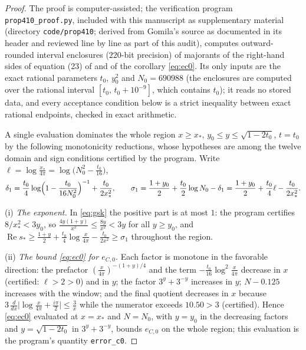 \documentclass[11pt]{article}
\theoremstyle{definition}
\DeclareMathOperator{\Rea}{Re}
\begin{document}
\begin{proof}
The proof is computer-assisted; the verification program
\texttt{prop410\_proof.py}, included with this manuscript as
supplementary material (directory \texttt{code/prop410}; derived
from Gomila's source as documented in its header and reviewed line
by line as part of this audit), computes outward-rounded interval
enclosures ($220$-bit precision) of majorants of the right-hand
sides of equation (23) of \cite{Polymath} and of the corollary
\eqref{eq:ec0}. Its only inputs are the exact rational parameters
$t_0$, $y_0^2$ and $N_0=690988$ (the enclosures are computed over
the rational interval $[t_0,\,t_0+10^{-9}]$, which contains $t_0$);
it reads no stored data, and every acceptance condition below is a
strict inequality between exact rational endpoints, checked in
exact arithmetic.

A single evaluation dominates the whole region $x\ge x_*$,
$y_0\le y\le\sqrt{1-2t_0}$, $t=t_0$ by the following monotonicity
reductions, whose hypotheses are among the twelve domain and sign
conditions certified by the program. Write
$\ell=\log\frac{x_*}{4\pi}=\log\bigl(N_0^2-\tfrac{t_0}{16}\bigr)$,
\[
\delta_1=\frac{t_0}4\log\Bigl(1-\frac{t_0}{16N_0^2}\Bigr)^{-1}
+\frac{t_0}{2x_*^2},
\qquad
\sigma_1=\frac{1+y_0}2+\frac{t_0}2\log N_0-\delta_1
=\frac{1+y_0}2+\frac{t_0}4\ell-\frac{t_0}{2x_*^2}.
\]

(i) \emph{The exponent.} In \eqref{eq:gsk} the positive part is at
most $1$: the program certifies $8/x_*^2<3y_0$, so
$\frac{4y(1+y)}{x^2}\le\frac{8y}{x^2}<3y$ for all $y\ge y_0$, and
$\Rea s_*\ge\frac{1+y}2+\frac{t_0}4\log\frac x{4\pi}
-\frac{t_0}{2x^2}\ge\sigma_1$ throughout the region.

(ii) \emph{The bound \eqref{eq:ec0} for $e_{C,0}$.} Each factor is
monotone in the favorable direction: the prefactor
$(\frac x{4\pi})^{-(1+y)/4}$ and the term
$-\frac{t_0}{16}\log^2\frac x{4\pi}$ decrease in $x$ (certified:
$\ell>2>0$) and in $y$; the factor $3^y+3^{-y}$ increases in $y$;
$N-0.125$ increases with the window; and the final quotient
decreases in $x$ because
$3\,\frac{d}{dx}\bigl|\log\tfrac x{4\pi}+\tfrac{i\pi}2\bigr|
\le\frac3x$ while the numerator exceeds $10.50>3$ (certified).
Hence \eqref{eq:ec0} evaluated at $x=x_*$ and $N=N_0$, with $y=y_0$
in the decreasing factors and $y=\sqrt{1-2t_0}$ in $3^y+3^{-y}$,
bounds $e_{C,0}$ on the whole region; this evaluation is the
program's quantity \texttt{error\_c0}.


\end{proof}
\end{document}
